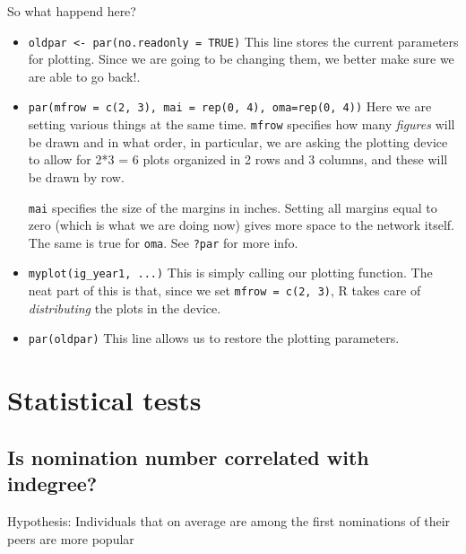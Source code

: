 \documentclass[
]{book}
\begin{document}
So what happend here?

\begin{itemize}
\item
  \texttt{oldpar\ \textless{}-\ par(no.readonly\ =\ TRUE)} This line stores the current parameters for plotting. Since we are going to be changing them, we better make sure we are able to go back!.
\item
  \texttt{par(mfrow\ =\ c(2,\ 3),\ mai\ =\ rep(0,\ 4),\ oma=rep(0,\ 4))} Here we are setting various things at the same time. \texttt{mfrow} specifies how many \emph{figures} will be drawn and in what order, in particular, we are asking the plotting device to allow for 2*3 = 6 plots organized in 2 rows and 3 columns, and these will be drawn by row.

  \texttt{mai} specifies the size of the margins in inches. Setting all margins equal to zero (which is what we are doing now) gives more space to the network itself. The same is true for \texttt{oma}. See \texttt{?par} for more info.
\item
  \texttt{myplot(ig\_year1,\ ...)} This is simply calling our plotting function. The neat part of this is that, since we set \texttt{mfrow\ =\ c(2,\ 3)}, R takes care of \emph{distributing} the plots in the device.
\item
  \texttt{par(oldpar)} This line allows us to restore the plotting parameters.
\end{itemize}

\hypertarget{statistical-tests}{%
\section{Statistical tests}\label{statistical-tests}}

\hypertarget{is-nomination-number-correlated-with-indegree}{%
\subsection{Is nomination number correlated with indegree?}\label{is-nomination-number-correlated-with-indegree}}

Hypothesis: Individuals that on average are among the first nominations of their peers are more popular
\end{document}
